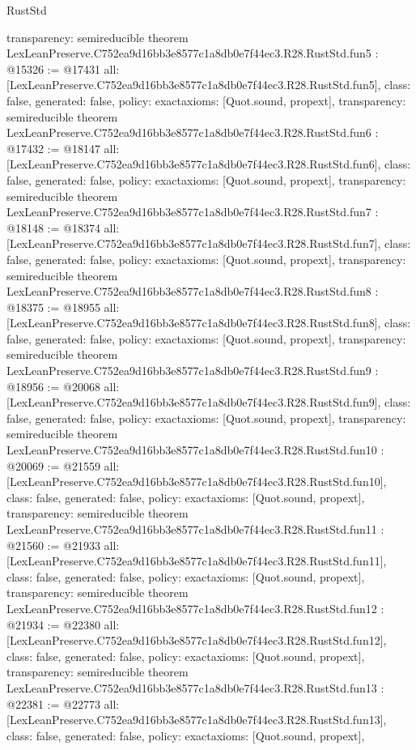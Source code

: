 \begin{lexlean}{RustStd}
\begin{coremodule}
{  transparency: semireducible
}
theorem LexLeanPreserve.C752ea9d16bb3e8577c1a8db0e7f44ec3.R28.RustStd.fun5 : @15326 := @17431 {
  all: [LexLeanPreserve.C752ea9d16bb3e8577c1a8db0e7f44ec3.R28.RustStd.fun5],
  class: false,
  generated: false,
  policy: exact{axioms: [Quot.sound, propext]},
  transparency: semireducible
}
theorem LexLeanPreserve.C752ea9d16bb3e8577c1a8db0e7f44ec3.R28.RustStd.fun6 : @17432 := @18147 {
  all: [LexLeanPreserve.C752ea9d16bb3e8577c1a8db0e7f44ec3.R28.RustStd.fun6],
  class: false,
  generated: false,
  policy: exact{axioms: [Quot.sound, propext]},
  transparency: semireducible
}
theorem LexLeanPreserve.C752ea9d16bb3e8577c1a8db0e7f44ec3.R28.RustStd.fun7 : @18148 := @18374 {
  all: [LexLeanPreserve.C752ea9d16bb3e8577c1a8db0e7f44ec3.R28.RustStd.fun7],
  class: false,
  generated: false,
  policy: exact{axioms: [Quot.sound, propext]},
  transparency: semireducible
}
theorem LexLeanPreserve.C752ea9d16bb3e8577c1a8db0e7f44ec3.R28.RustStd.fun8 : @18375 := @18955 {
  all: [LexLeanPreserve.C752ea9d16bb3e8577c1a8db0e7f44ec3.R28.RustStd.fun8],
  class: false,
  generated: false,
  policy: exact{axioms: [Quot.sound, propext]},
  transparency: semireducible
}
theorem LexLeanPreserve.C752ea9d16bb3e8577c1a8db0e7f44ec3.R28.RustStd.fun9 : @18956 := @20068 {
  all: [LexLeanPreserve.C752ea9d16bb3e8577c1a8db0e7f44ec3.R28.RustStd.fun9],
  class: false,
  generated: false,
  policy: exact{axioms: [Quot.sound, propext]},
  transparency: semireducible
}
theorem LexLeanPreserve.C752ea9d16bb3e8577c1a8db0e7f44ec3.R28.RustStd.fun10 : @20069 := @21559 {
  all: [LexLeanPreserve.C752ea9d16bb3e8577c1a8db0e7f44ec3.R28.RustStd.fun10],
  class: false,
  generated: false,
  policy: exact{axioms: [Quot.sound, propext]},
  transparency: semireducible
}
theorem LexLeanPreserve.C752ea9d16bb3e8577c1a8db0e7f44ec3.R28.RustStd.fun11 : @21560 := @21933 {
  all: [LexLeanPreserve.C752ea9d16bb3e8577c1a8db0e7f44ec3.R28.RustStd.fun11],
  class: false,
  generated: false,
  policy: exact{axioms: [Quot.sound, propext]},
  transparency: semireducible
}
theorem LexLeanPreserve.C752ea9d16bb3e8577c1a8db0e7f44ec3.R28.RustStd.fun12 : @21934 := @22380 {
  all: [LexLeanPreserve.C752ea9d16bb3e8577c1a8db0e7f44ec3.R28.RustStd.fun12],
  class: false,
  generated: false,
  policy: exact{axioms: [Quot.sound, propext]},
  transparency: semireducible
}
theorem LexLeanPreserve.C752ea9d16bb3e8577c1a8db0e7f44ec3.R28.RustStd.fun13 : @22381 := @22773 {
  all: [LexLeanPreserve.C752ea9d16bb3e8577c1a8db0e7f44ec3.R28.RustStd.fun13],
  class: false,
  generated: false,
  policy: exact{axioms: [Quot.sound, propext]},
}
\end{coremodule}
\end{lexlean}
